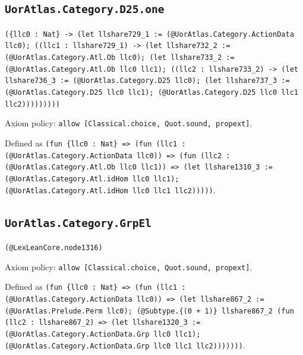\documentclass[11pt]{article}
\begin{document}
\subsection*{\texttt{UorAtlas.Category.D25.one}}
\noindent\texttt{(\{llc0 : Nat\} -> (let llshare729\_1 := (@UorAtlas.Category.ActionData llc0); ((llc1 : llshare729\_1) -> (let llshare732\_2 := (@UorAtlas.Category.Atl.Ob llc0); (let llshare733\_2 := (@UorAtlas.Category.Atl.Ob llc0 llc1); ((llc2 : llshare733\_2) -> (let llshare736\_3 := (@UorAtlas.Category.D25 llc0); (let llshare737\_3 := (@UorAtlas.Category.D25 llc0 llc1); (@UorAtlas.Category.D25 llc0 llc1 llc2)))))))))}\par
\noindent Axiom policy: \texttt{allow [Classical.choice, Quot.sound, propext]}.\par
\noindent Defined as \texttt{(fun \{llc0 : Nat\} => (fun (llc1 : (@UorAtlas.Category.ActionData llc0)) => (fun (llc2 : (@UorAtlas.Category.Atl.Ob llc0 llc1)) => (let llshare1310\_3 := (@UorAtlas.Category.Atl.idHom llc0 llc1); (@UorAtlas.Category.Atl.idHom llc0 llc1 llc2)))))}.\par
\subsection*{\texttt{UorAtlas.Category.GrpEl}}
\noindent\texttt{(@LexLeanCore.node1316)}\par
\noindent Axiom policy: \texttt{allow [Classical.choice, Quot.sound, propext]}.\par
\noindent Defined as \texttt{(fun \{llc0 : Nat\} => (fun (llc1 : (@UorAtlas.Category.ActionData llc0)) => (let llshare867\_2 := (@UorAtlas.Prelude.Perm llc0); (@Subtype.\{(0 + 1)\} llshare867\_2 (fun (llc2 : llshare867\_2) => (let llshare1320\_3 := (@UorAtlas.Category.ActionData.Grp llc0 llc1); (@UorAtlas.Category.ActionData.Grp llc0 llc1 llc2)))))))}.\par
\end{document}
